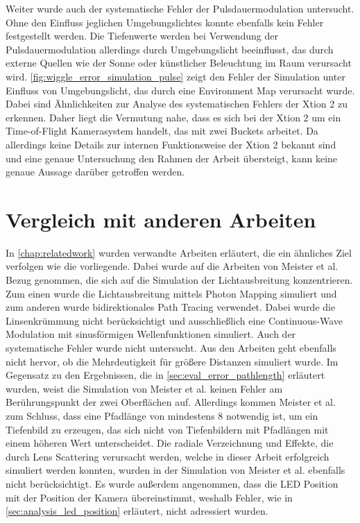 \documentclass[thesis.tex]{subfiles}
\begin{document}
Weiter wurde auch der systematische Fehler der Pulsdauermodulation untersucht. Ohne den Einfluss jeglichen Umgebungslichtes konnte ebenfalls kein Fehler festgestellt werden. Die Tiefenwerte werden bei Verwendung der Pulsdauermodulation allerdings durch Umgebungslicht beeinflusst, das durch externe Quellen wie der Sonne oder künstlicher Beleuchtung im Raum verursacht wird. \autoref{fig:wiggle_error_simulation_pulse} zeigt den Fehler der Simulation unter Einfluss von Umgebungslicht, das durch eine Environment Map verursacht wurde. Dabei sind Ähnlichkeiten zur Analyse des systematischen Fehlers der Xtion 2 zu erkennen. Daher liegt die Vermutung nahe, dass es sich bei der Xtion 2 um ein Time-of-Flight Kamerasystem handelt, das mit zwei Buckets arbeitet. Da allerdings keine Details zur internen Funktionsweise der Xtion 2 bekannt sind und eine genaue Untersuchung den Rahmen der Arbeit übersteigt, kann keine genaue Aussage darüber getroffen werden.

\section{Vergleich mit anderen Arbeiten}

In \autoref{chap:relatedwork} wurden verwandte Arbeiten erläutert, die ein ähnliches Ziel verfolgen wie die vorliegende. Dabei wurde auf die Arbeiten von Meister et al. \cite{bib:Meister2012PhotonMB}\cite{bib:Meister2013} Bezug genommen, die sich auf die Simulation der Lichtausbreitung konzentrieren. Zum einen wurde die Lichtausbreitung mittels Photon Mapping simuliert und zum anderen wurde bidirektionales Path Tracing verwendet. Dabei wurde die Linsenkrümmung nicht berücksichtigt und ausschließlich eine Continuous-Wave Modulation mit sinusförmigen Wellenfunktionen simuliert. Auch der systematische Fehler wurde nicht untersucht. Aus den Arbeiten geht ebenfalls nicht hervor, ob die Mehrdeutigkeit für größere Distanzen simuliert wurde. Im Gegensatz zu den Ergebnissen, die in \autoref{sec:eval_error_pathlength} erläutert wurden, weist die Simulation von Meister et al. \cite{bib:Meister2013} keinen Fehler am Berührungspunkt der zwei Oberflächen auf. Allerdings kommen Meister et al. zum Schluss, dass eine Pfadlänge von mindestens 8 notwendig ist, um ein Tiefenbild zu erzeugen, das sich nicht von Tiefenbildern mit Pfadlängen mit einem höheren Wert unterscheidet. Die radiale Verzeichnung und Effekte, die durch Lens Scattering verursacht werden, welche in dieser Arbeit erfolgreich simuliert werden konnten, wurden in der Simulation von Meister et al. ebenfalls nicht berücksichtigt. Es wurde außerdem angenommen, dass die LED Position mit der Position der Kamera übereinstimmt, weshalb Fehler, wie in \autoref{sec:analysis_led_position} erläutert, nicht adressiert wurden.
\end{document}

